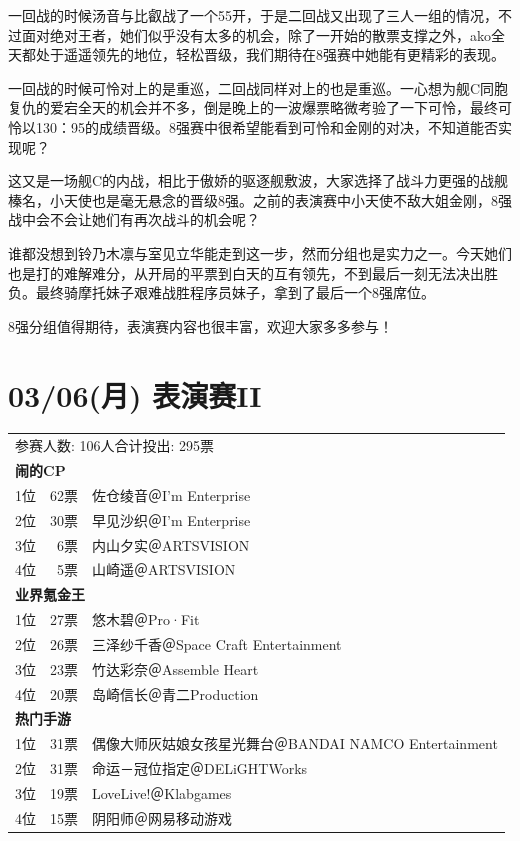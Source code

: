 
一回战的时候汤音与比叡战了一个55开，于是二回战又出现了三人一组的情况，不过面对绝对王者，她们似乎没有太多的机会，除了一开始的散票支撑之外，ako全天都处于遥遥领先的地位，轻松晋级，我们期待在8强赛中她能有更精彩的表现。


一回战的时候可怜对上的是重巡，二回战同样对上的也是重巡。一心想为舰C同胞复仇的爱宕全天的机会并不多，倒是晚上的一波爆票略微考验了一下可怜，最终可怜以130：95的成绩晋级。8强赛中很希望能看到可怜和金刚的对决，不知道能否实现呢？


这又是一场舰C的内战，相比于傲娇的驱逐舰敷波，大家选择了战斗力更强的战舰榛名，小天使也是毫无悬念的晋级8强。之前的表演赛中小天使不敌大姐金刚，8强战中会不会让她们有再次战斗的机会呢？


谁都没想到铃乃木凛与室见立华能走到这一步，然而分组也是实力之一。今天她们也是打的难解难分，从开局的平票到白天的互有领先，不到最后一刻无法决出胜负。最终骑摩托妹子艰难战胜程序员妹子，拿到了最后一个8强席位。

8强分组值得期待，表演赛内容也很丰富，欢迎大家多多参与！


\newpage
\section{03/06(月) 表演赛II}

{\kai\begin{longtable}{rrl}
\multicolumn{3}{l}{参赛人数: 106人\quad 合计投出: 295票} \\
\multicolumn{3}{l}{\bfseries 闹的CP } \\
1位 & 62票 & 佐仓绫音＠I'm Enterprise \\
2位 & 30票 & 早见沙织＠I'm Enterprise \\
3位 & 6票 & 内山夕实＠ARTSVISION \\
4位 & 5票 & 山崎遥＠ARTSVISION \\
\multicolumn{3}{l}{\bfseries 业界氪金王 } \\
1位 & 27票 & 悠木碧＠Pro·Fit \\
2位 & 26票 & 三泽纱千香＠Space Craft Entertainment \\
3位 & 23票 & 竹达彩奈＠Assemble Heart \\
4位 & 20票 & 岛崎信长＠青二Production \\
\multicolumn{3}{l}{\bfseries 热门手游 } \\
1位 & 31票 & 偶像大师灰姑娘女孩星光舞台＠BANDAI NAMCO Entertainment \\
2位 & 31票 & 命运－冠位指定＠DELiGHTWorks \\
3位 & 19票 & LoveLive!＠Klabgames \\
4位 & 15票 & 阴阳师＠网易移动游戏 \\
\end{longtable}}


